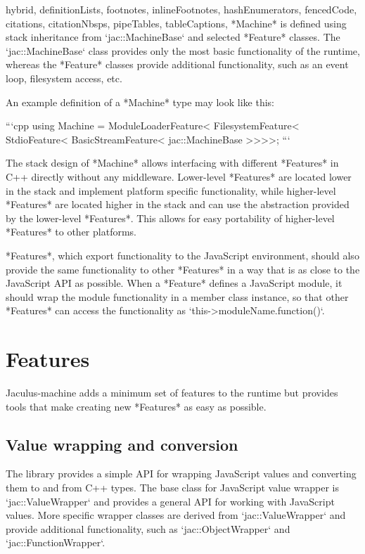 \documentclass[
  digital,
  oneside,
  nosansbold,
  nocolorbold,
  lof,
  lot
]{fithesis4}
\begin{document}
\begin{markdown*}{%
  hybrid,
  definitionLists,
  footnotes,
  inlineFootnotes,
  hashEnumerators,
  fencedCode,
  citations,
  citationNbsps,
  pipeTables,
  tableCaptions,
}
*Machine* is defined using stack inheritance from `jac::MachineBase` and selected *Feature* classes. The `jac::MachineBase` class provides only the most basic functionality of the runtime, whereas the *Feature* classes provide additional functionality, such as an event loop, filesystem access, etc.

An example definition of a *Machine* type may look like this:

```cpp
using Machine =
    ModuleLoaderFeature<
    FilesystemFeature<
    StdioFeature<
    BasicStreamFeature<
    jac::MachineBase
>>>>;
```

The stack design of *Machine* allows interfacing with different *Features* in C++ directly without any middleware. Lower-level *Features* are located lower in the stack and implement platform specific functionality, while higher-level *Features* are located higher in the stack and can use the abstraction provided by the lower-level *Features*. This allows for easy portability of higher-level *Features* to other platforms.

*Features*, which export functionality to the JavaScript environment, should also provide the same functionality to other *Features* in a way that is as close to the JavaScript API as possible. When a *Feature* defines a JavaScript module, it should wrap the module functionality in a member class instance, so that other *Features* can access the functionality as `this->moduleName.function()`.


\section{Features}

Jaculus-machine adds a minimum set of features to the runtime but provides tools that make creating new *Features* as easy as possible.

\subsection{Value wrapping and conversion}

The library provides a simple API for wrapping JavaScript values and converting them to and from C++ types. The base class for JavaScript value wrapper is `jac::ValueWrapper` and provides a general API for working with JavaScript values. More specific wrapper classes are derived from `jac::ValueWrapper` and provide additional functionality, such as `jac::ObjectWrapper` and `jac::FunctionWrapper`.


\end{markdown*}
\end{document}
